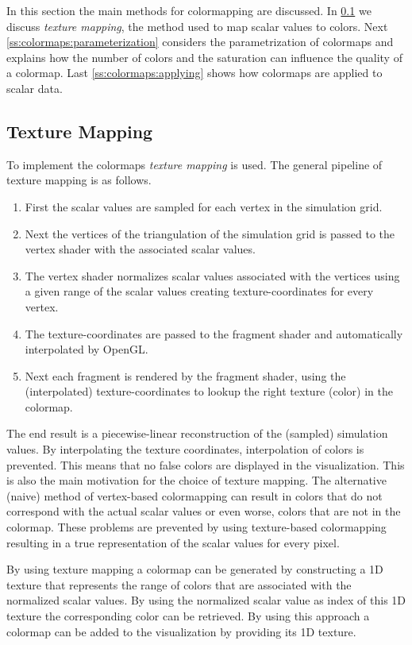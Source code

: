 In this section the main methods for colormapping are discussed. In \cref{sub:texture_mapping} we discuss \emph{texture mapping}, the method used to map scalar values to colors. Next \cref{ss:colormaps:parameterization} considers the parametrization of colormaps and explains how the number of colors and the saturation can influence the quality of a colormap. Last \cref{ss:colormaps:applying} shows how colormaps are applied to scalar data.

\subsection{Texture Mapping} %
\label{sub:texture_mapping}
To implement the colormaps \emph{texture mapping} is used. The general pipeline of texture mapping is as follows.
\begin{enumerate}
	\item First the scalar values are sampled for each vertex in the simulation grid.
	\item Next the vertices of the triangulation of the simulation grid is passed to the vertex shader with the associated scalar values.
	\item The vertex shader normalizes scalar values associated with the vertices using a given range of the scalar values creating texture-coordinates for every vertex.
	\item The texture-coordinates are passed to the fragment shader and automatically interpolated by OpenGL.
	\item Next each fragment is rendered by the fragment shader, using the (interpolated) texture-coordinates to lookup the right texture (color) in the colormap.
\end{enumerate}
The end result is a piecewise-linear reconstruction of the (sampled) simulation values. By interpolating the texture coordinates, interpolation of colors is prevented.  This means that no false colors are displayed in the visualization. This is also the main motivation for the choice of texture mapping. The alternative (naive) method of vertex-based colormapping can result in colors that do not correspond with the actual scalar values or even worse, colors that are not in the colormap. These problems are prevented by using texture-based colormapping resulting in a true representation of the scalar values for every pixel.

By using texture mapping a colormap can be generated by constructing a 1D texture that represents the range of colors that are associated with the normalized scalar values. By using the normalized scalar value as index of this 1D texture the corresponding color can be retrieved. By using this approach a colormap can be added to the visualization by providing its 1D texture.

